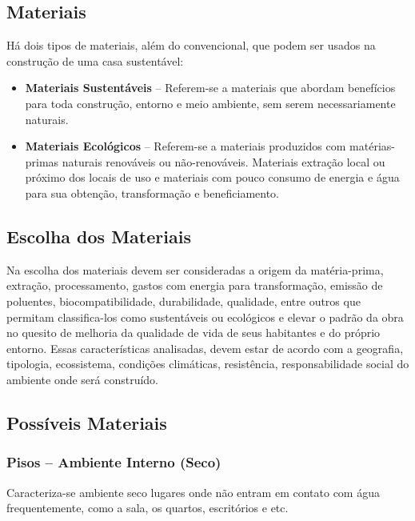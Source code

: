 \subsection{Materiais}

	Há dois tipos de materiais, além do convencional, que podem ser usados na construção de uma casa sustentável:
	
\begin{itemize}

	\item \textbf{Materiais Sustentáveis} – Referem-se a materiais que abordam benefícios para toda construção, entorno e meio ambiente, sem serem necessariamente naturais. 

	\item \textbf{Materiais Ecológicos} – Referem-se a materiais produzidos com matérias-primas naturais renováveis ou não-renováveis. Materiais extração local ou próximo dos locais de uso e materiais com pouco consumo de energia e água para sua obtenção, transformação e beneficiamento.

\end{itemize}

\subsection{Escolha dos Materiais}

	Na escolha dos materiais devem ser consideradas a origem da matéria-prima, extração, processamento, gastos com energia para transformação, emissão de poluentes, biocompatibilidade, durabilidade, qualidade, entre outros que permitam classifica-los como sustentáveis ou ecológicos e elevar o padrão da obra no quesito de melhoria da qualidade de vida de seus habitantes e do próprio entorno. Essas características analisadas, devem estar de acordo com a geografia, tipologia, ecossistema, condições climáticas, resistência, responsabilidade social do ambiente onde será construído.

\subsection{Possíveis Materiais}

\subsubsection{Pisos – Ambiente Interno (Seco)}

	Caracteriza-se ambiente seco lugares onde não entram em contato com água frequentemente, como a sala, os quartos, escritórios e etc.\\

